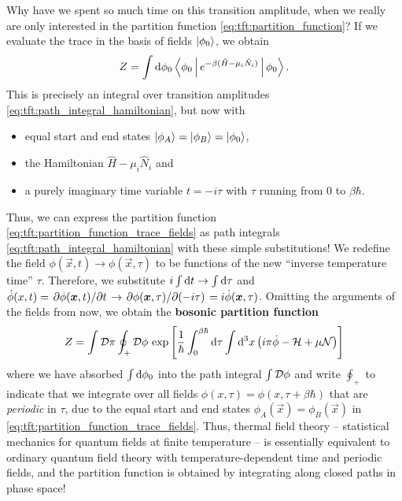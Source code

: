 Why have we spent so much time on this transition amplitude, when we really are only interested in the partition function \eqref{eq:tft:partition_function}?
If we evaluate the trace in the basis of fields $\ket{\phi_0}$, we obtain
\begin{equation}
	Z = \int \mathop{}\!\mathrm{d} \phi_0 \Braket{\phi_0 | e^{-\beta (\hat{H} - \mu_i \hat{N}_i)} | \phi_0} .
\label{eq:tft:partition_function_trace_fields}
\end{equation}
This is precisely an integral over transition amplitudes \eqref{eq:tft:path_integral_hamiltonian}, but now with 
\begin{itemize}
\item equal start and end states $\ket{\phi_A} = \ket{\phi_B} = \ket{\phi_0}$, 
\item the Hamiltonian $\hat{H} - \mu_i \hat{N}_i$ and 
\item a purely imaginary time variable $t = -i \tau$ with $\tau$ running from $0$ to $\beta \hbar$.
\end{itemize}
Thus, we can express the partition function \eqref{eq:tft:partition_function_trace_fields} as path integrals \eqref{eq:tft:path_integral_hamiltonian} with these simple substitutions!
We redefine the field $\phi(\vec{x}, t) \rightarrow \phi(\vec{x}, \tau)$ to be functions of the new ``inverse temperature time'' $\tau$.
Therefore, we substitute $i \int \mathop{}\!\mathrm{d} t \rightarrow \int \mathop{}\!\mathrm{d} \tau$ and $\dot\phi(x, t) = \pdv{\phi({\bm{x}},t)}/{t} \rightarrow \pdv{\phi({\bm{x}},\tau)}/{(-i \tau)} = i \dot\phi({\bm{x}},\tau)$.
Omitting the arguments of the fields from now, we obtain the \textbf{bosonic partition function}
\begin{equation}
	Z = \int \mathcal{D} \pi \oint_+ \mathcal{D} \phi \, \exp \left[ \frac{1}{\hbar} \int_0^{\beta \hbar} \mathop{}\!\mathrm{d} \tau \int \mathop{}\!\mathrm{d}^3 x \left( i \pi \dot{\phi} - \mathcal{H} + \mu \mathcal{N} \right) \right]
\label{eq:tft:bosonic_partition_function}
\end{equation}
where we have absorbed $\int \mathop{}\!\mathrm{d} \phi_0$ into the path integral $\int \mathcal{D} \phi$ and write $\oint_+$ to indicate that we integrate over all fields $\phi(x, \tau) = \phi(x, \tau + \beta \hbar)$ that are \emph{periodic} in $\tau$, due to the equal start and end states $\phi_A(\vec{x}) = \phi_B(\vec{x})$ in \cref{eq:tft:partition_function_trace_fields}.
Thus, thermal field theory -- statistical mechanics for quantum fields at finite temperature -- is essentially equivalent to ordinary quantum field theory with temperature-dependent time and periodic fields, and the partition function is obtained by integrating along closed paths in phase space!

